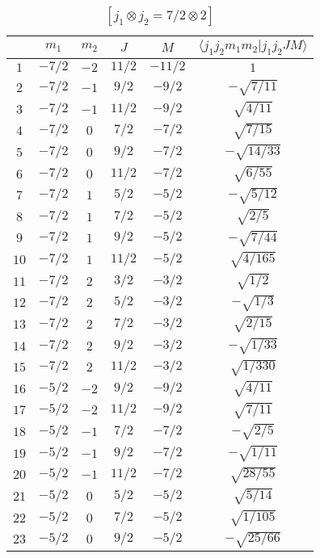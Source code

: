 \begin{table}
\tiny
\caption{$[j_1 \otimes j_2 = 7/2 \otimes 2]$}
\begin{center}
\begin{tabular}{|c|c|c|c|c|c|}
\hline 
   & $m_1$ & $m_2$ & $J$ & $M$ & $\langle j_1 j_2 m_1 m_2 | j_1 j_2 J M \rangle$ \\ 
\hline 
$1$ & $-7/2$ & $-2$ & $11/2$ & $-11/2$ & $1$ \\ 
$2$ & $-7/2$ & $-1$ & $9/2$ & $-9/2$ & $-\sqrt{7/11}$ \\ 
$3$ & $-7/2$ & $-1$ & $11/2$ & $-9/2$ & $\sqrt{4/11}$ \\ 
$4$ & $-7/2$ & $0$ & $7/2$ & $-7/2$ & $\sqrt{7/15}$ \\ 
$5$ & $-7/2$ & $0$ & $9/2$ & $-7/2$ & $-\sqrt{14/33}$ \\ 
$6$ & $-7/2$ & $0$ & $11/2$ & $-7/2$ & $\sqrt{6/55}$ \\ 
$7$ & $-7/2$ & $1$ & $5/2$ & $-5/2$ & $-\sqrt{5/12}$ \\ 
$8$ & $-7/2$ & $1$ & $7/2$ & $-5/2$ & $\sqrt{2/5}$ \\ 
$9$ & $-7/2$ & $1$ & $9/2$ & $-5/2$ & $-\sqrt{7/44}$ \\ 
$10$ & $-7/2$ & $1$ & $11/2$ & $-5/2$ & $\sqrt{4/165}$ \\ 
$11$ & $-7/2$ & $2$ & $3/2$ & $-3/2$ & $\sqrt{1/2}$ \\ 
$12$ & $-7/2$ & $2$ & $5/2$ & $-3/2$ & $-\sqrt{1/3}$ \\ 
$13$ & $-7/2$ & $2$ & $7/2$ & $-3/2$ & $\sqrt{2/15}$ \\ 
$14$ & $-7/2$ & $2$ & $9/2$ & $-3/2$ & $-\sqrt{1/33}$ \\ 
$15$ & $-7/2$ & $2$ & $11/2$ & $-3/2$ & $\sqrt{1/330}$ \\ 
$16$ & $-5/2$ & $-2$ & $9/2$ & $-9/2$ & $\sqrt{4/11}$ \\ 
$17$ & $-5/2$ & $-2$ & $11/2$ & $-9/2$ & $\sqrt{7/11}$ \\ 
$18$ & $-5/2$ & $-1$ & $7/2$ & $-7/2$ & $-\sqrt{2/5}$ \\ 
$19$ & $-5/2$ & $-1$ & $9/2$ & $-7/2$ & $-\sqrt{1/11}$ \\ 
$20$ & $-5/2$ & $-1$ & $11/2$ & $-7/2$ & $\sqrt{28/55}$ \\ 
$21$ & $-5/2$ & $0$ & $5/2$ & $-5/2$ & $\sqrt{5/14}$ \\ 
$22$ & $-5/2$ & $0$ & $7/2$ & $-5/2$ & $\sqrt{1/105}$ \\ 
$23$ & $-5/2$ & $0$ & $9/2$ & $-5/2$ & $-\sqrt{25/66}$ \\ 

\end{tabular}
\end{center}
\end{table}
